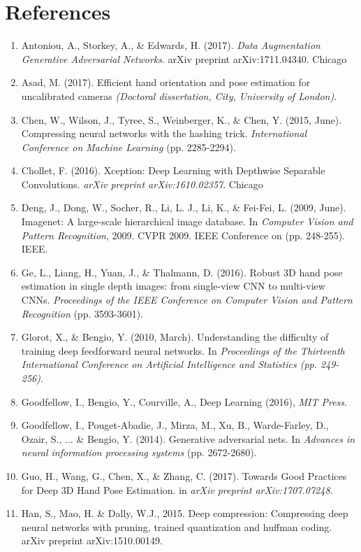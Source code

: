 \documentclass{article}
\begin{document}
{\section*{References}
\begin{enumerate}
\item Antoniou, A., Storkey, A., \& Edwards, H. (2017).
 \emph{Data Augmentation Generative Adversarial Networks}. arXiv preprint arXiv:1711.04340.
Chicago	
\item Asad, M. (2017). Efficient hand orientation and pose estimation for uncalibrated cameras \emph{(Doctoral dissertation, City, University of London)}.
\item Chen, W., Wilson, J., Tyree, S., Weinberger, K., \& Chen, Y. (2015, June). Compressing neural networks with the hashing trick. \emph{International Conference on Machine Learning} (pp. 2285-2294).
\item Chollet, F. (2016). Xception: Deep Learning with Depthwise Separable Convolutions. \emph{arXiv preprint arXiv:1610.02357}.
Chicago	
\item Deng, J., Dong, W., Socher, R., Li, L. J., Li, K., \& Fei-Fei, L. (2009, June). Imagenet: A large-scale hierarchical image database. In \emph{Computer Vision and Pattern Recognition}, 2009. CVPR 2009. IEEE Conference on (pp. 248-255). IEEE.
\item Ge, L., Liang, H., Yuan, J., \& Thalmann, D. (2016). Robust 3D hand pose estimation in single depth images: from single-view CNN to multi-view CNNs. \emph{Proceedings of the IEEE Conference on Computer Vision and Pattern Recognition} (pp. 3593-3601).
\item Glorot, X., \& Bengio, Y. (2010, March). Understanding the difficulty of training deep feedforward neural networks. In \emph{ Proceedings of the Thirteenth International Conference on Artificial Intelligence and Statistics (pp. 249-256)}.
\item Goodfellow, I., Bengio, Y., Courville, A., Deep Learning (2016), \emph{MIT Press}.
\item Goodfellow, I., Pouget-Abadie, J., Mirza, M., Xu, B., Warde-Farley, D., Ozair, S., ... \& Bengio, Y. (2014). Generative adversarial nets. In \emph{Advances in neural information processing systems} (pp. 2672-2680).
\item Guo, H., Wang, G., Chen, X., \& Zhang, C. (2017). Towards Good Practices for Deep 3D Hand Pose Estimation. in \emph{arXiv preprint arXiv:1707.07248}.
\item Han, S., Mao, H. \& Dally, W.J., 2015. Deep compression: Compressing deep neural networks with pruning, trained quantization and huffman coding. arXiv preprint arXiv:1510.00149.

\end{enumerate}}
\end{document}
